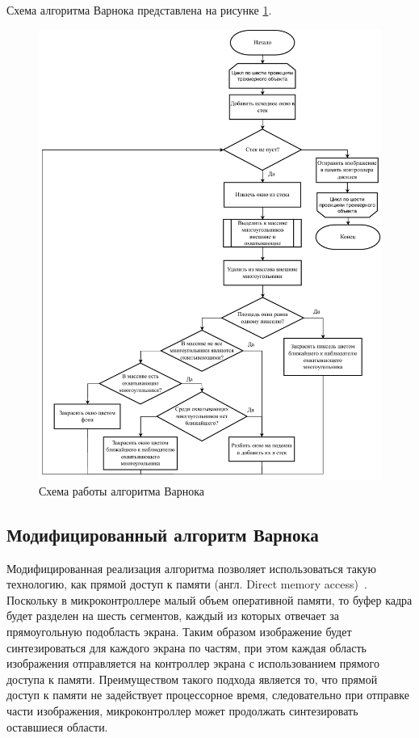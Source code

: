 Схема алгоритма Варнока представлена на рисунке \ref{fig:warnock}.

\begin{figure}[H]
	\centering
	\includegraphics[height=0.75\textheight]{inc/img/warnock.pdf}
	\caption{Схема работы алгоритма Варнока}
	\label{fig:warnock}
\end{figure}

\subsection{Модифицированный алгоритм Варнока}
Модифицированная реализация алгоритма позволяет использоваться такую технологию, как прямой доступ к памяти (англ. Direct memory access)~\cite{dma}. Поскольку в микроконтроллере малый объем оперативной памяти, то буфер кадра будет разделен на шесть сегментов, каждый из которых отвечает за прямоугольную подобласть экрана. Таким образом изображение будет синтезироваться для каждого экрана по частям, при этом каждая область изображения отправляется на контроллер экрана с использованием прямого доступа к памяти. Преимуществом такого подхода является то, что прямой доступ к памяти не задействует процессорное время, следовательно при отправке части изображения, микроконтроллер может продолжать синтезировать оставшиеся области. 

